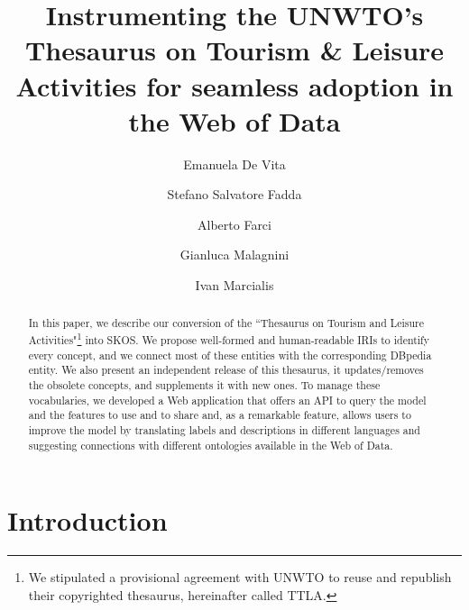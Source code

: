\documentclass[runningheads,a4paper]{llncs}
\begin{document}
\mainmatter

\title{Instrumenting the UNWTO’s Thesaurus on Tourism & Leisure Activities for seamless adoption in the Web of Data}
\author{Emanuela De Vita \and
Stefano Salvatore Fadda \and
Alberto Farci \and
Gianluca Malagnini \and
Ivan Marcialis}
\maketitle

\begin{abstract}
In this paper, we describe our conversion of the ``Thesaurus on Tourism and Leisure Activities"\footnote{ We stipulated a provisional agreement with UNWTO to reuse and republish their copyrighted thesaurus, hereinafter called TTLA.} into SKOS. We propose well-formed and human-readable IRIs to identify every concept, and we connect most of these entities with the corresponding DBpedia entity. We also present an independent release of this thesaurus, it updates/removes the obsolete concepts, and supplements it with new ones. To manage these vocabularies, we developed a Web application that offers an API to query the model and the features to use and to share and, as a remarkable feature, allows users to improve the model by translating labels and descriptions in different languages and suggesting connections with different ontologies available in the Web of Data. 

\end{abstract}


\section{Introduction}
\end{document}
